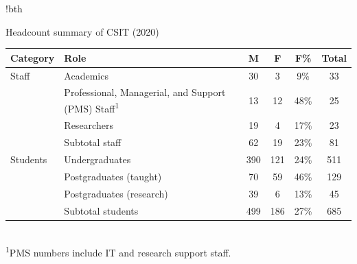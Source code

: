 \begin{tabbox}{!bth}

\caption[Headcount summary of school of CSIT]{Headcount summary of CSIT (2020)
}
\label{tab:headcount}
\footnotesize   
\begin{tabular}{p{2.5cm}
                p{7.5cm} 
                S[table-format=3.0]
                !{\qquad}
                S[table-format=2.0]
                !{\qquad}
                S[table-format=2.0\%]
                !{\qquad}
                S[table-format=2.0]} 

\toprule 
Category & Role & {M} & {F} & {F\%} & {Total}\\
\midrule 
Staff & Academics & 30 & 3 & 9\% & 33\\
& Professional, Managerial, and Support (PMS) Staff\textsuperscript{1} & 13 & 12 & 48\% & 25\\
& Researchers & 19 & 4 & 17\% & 23\\
& Subtotal staff & 62 & 19 & 23\% & 81\\
\midrule 
Students & Undergraduates & 390 & 121 & 24\% & 511\\
& Postgraduates (taught) & 70 & 59 & 46\% & 129\\
& Postgraduates (research) & 39 & 6 & 13\% & 45\\
& Subtotal students & 499 & 186 & 27\% & 685\\
\bottomrule 
\end{tabular}
{\\[.1in]
\sffamily 
\textsuperscript{1}PMS numbers include IT and research support staff.
} 
\end{tabbox}
